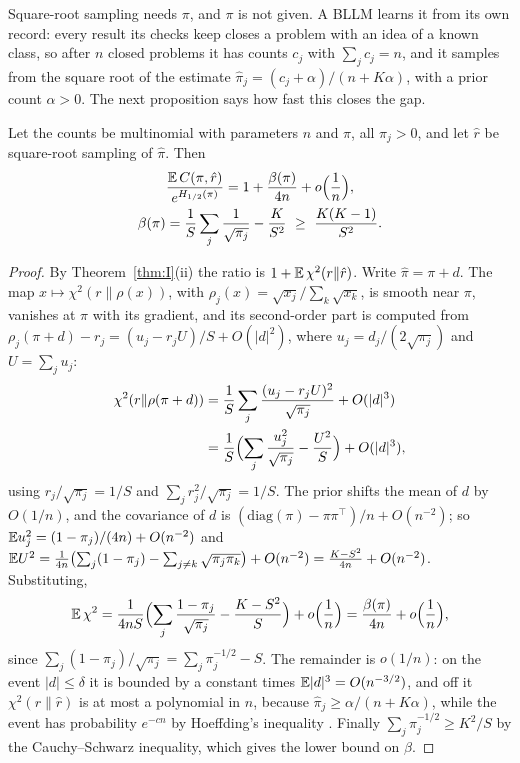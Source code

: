 Square-root sampling needs $\pi$, and $\pi$ is not given. A BLLM learns it from its own record: every result its checks keep closes a problem with an idea of a known class, so after $n$ closed problems it has counts $c_{j}$ with $\sum_{j}c_{j}=n$, and it samples from the square root of the estimate $\hat\pi_{j}=(c_{j}+\alpha)/(n+K\alpha)$, with a prior count $\alpha>0$. The next proposition says how fast this closes the gap.

\begin{proposition}\label{prop:learnrate}
Let the counts be multinomial with parameters $n$ and $\pi$, all $\pi_{j}>0$, and let $\hat r$ be square-root sampling of $\hat\pi$. Then
\begin{equation}\label{eq:learnrate}
\begin{gathered}\frac{\EE\,C(\pi,\hat r)}{e^{H_{1/2}(\pi)}}=1+\frac{\beta(\pi)}{4n}+o\Bigl(\frac1n\Bigr),\\ \beta(\pi)=\frac1S\sum_{j}\frac{1}{\sqrt{\pi_{j}}}-\frac{K}{S^{2}}\ \ge\ \frac{K(K-1)}{S^{2}} .\end{gathered}
\end{equation}
\end{proposition}

\begin{proof}
By Theorem~\ref{thm:I}(ii) the ratio is $1+\mathbb{E}\,\chi^{2}(r\|\hat r)$. Write $\hat\pi=\pi+d$. The map $x\mapsto\chi^{2}(r\|\rho(x))$, with $\rho_{j}(x)=\sqrt{x_{j}}/\sum_{k}\sqrt{x_{k}}$, is smooth near $\pi$, vanishes at $\pi$ with its gradient, and its second-order part is computed from $\rho_{j}(\pi+d)-r_{j}=(u_{j}-r_{j}U)/S+O(|d|^{2})$, where $u_{j}=d_{j}/(2\sqrt{\pi_{j}})$ and $U=\sum_{j}u_{j}$:
\[
\begin{aligned}\chi^{2}(r\|\rho(\pi+d))&=\frac1S\sum_{j}\frac{(u_{j}-r_{j}U)^{2}}{\sqrt{\pi_{j}}}+O(|d|^{3})\\&=\frac1S\Bigl(\sum_{j}\frac{u_{j}^{2}}{\sqrt{\pi_{j}}}-\frac{U^{2}}{S}\Bigr)+O(|d|^{3}),\end{aligned}
\]
using $r_{j}/\sqrt{\pi_{j}}=1/S$ and $\sum_{j}r_{j}^{2}/\sqrt{\pi_{j}}=1/S$. The prior shifts the mean of $d$ by $O(1/n)$, and the covariance of $d$ is $(\mathrm{diag}(\pi)-\pi\pi^{\top})/n+O(n^{-2})$; so $\mathbb{E} u_{j}^{2}=(1-\pi_{j})/(4n)+O(n^{-2})$ and $\mathbb{E} U^{2}=\frac1{4n}\bigl(\sum_{j}(1-\pi_{j})-\sum_{j\ne k}\sqrt{\pi_{j}\pi_{k}}\bigr)+O(n^{-2})=\frac{K-S^{2}}{4n}+O(n^{-2})$. Substituting,
\[
\mathbb{E}\,\chi^{2}=\frac1{4nS}\Bigl(\sum_{j}\frac{1-\pi_{j}}{\sqrt{\pi_{j}}}-\frac{K-S^{2}}{S}\Bigr)+o\Bigl(\frac1n\Bigr)=\frac{\beta(\pi)}{4n}+o\Bigl(\frac1n\Bigr),
\]
since $\sum_{j}(1-\pi_{j})/\sqrt{\pi_{j}}=\sum_{j}\pi_{j}^{-1/2}-S$. The remainder is $o(1/n)$: on the event $|d|\le\delta$ it is bounded by a constant times $\mathbb{E}|d|^{3}=O(n^{-3/2})$, and off it $\chi^{2}(r\|\hat r)$ is at most a polynomial in $n$, because $\hat\pi_{j}\ge\alpha/(n+K\alpha)$, while the event has probability $e^{-cn}$ by Hoeffding's inequality \cite{Hoe63}. Finally $\sum_{j}\pi_{j}^{-1/2}\ge K^{2}/S$ by the Cauchy--Schwarz inequality, which gives the lower bound on $\beta$.
\end{proof}

